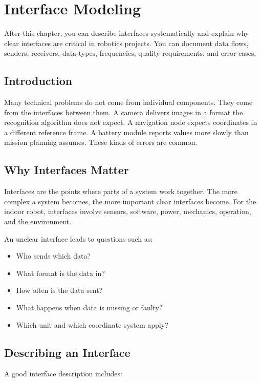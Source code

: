 \chapter{Interface Modeling}

\begin{lernziele}
After this chapter, you can describe interfaces systematically and explain why clear interfaces are critical in robotics projects. You can document data flows, senders, receivers, data types, frequencies, quality requirements, and error cases.
\end{lernziele}

\section{Introduction}
Many technical problems do not come from individual components. They come from the interfaces between them. A camera delivers images in a format the recognition algorithm does not expect. A navigation node expects coordinates in a different reference frame. A battery module reports values more slowly than mission planning assumes. These kinds of errors are common.

\section{Why Interfaces Matter}
Interfaces are the points where parts of a system work together. The more complex a system becomes, the more important clear interfaces become. For the indoor robot, interfaces involve sensors, software, power, mechanics, operation, and the environment.

An unclear interface leads to questions such as:

\begin{itemize}
    \item Who sends which data?
    \item What format is the data in?
    \item How often is the data sent?
    \item What happens when data is missing or faulty?
    \item Which unit and which coordinate system apply?
\end{itemize}

\section{Describing an Interface}
A good interface description includes:

